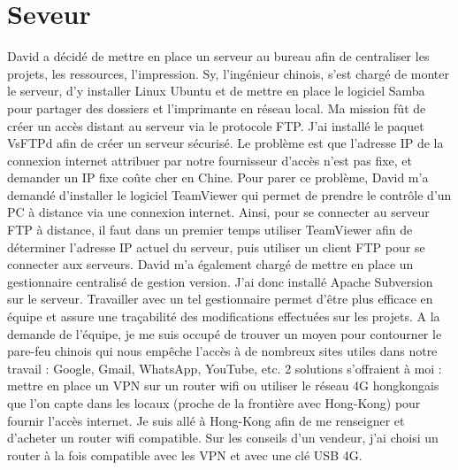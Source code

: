 \documentclass[a4paper, 11pt]{report}
\begin{document}
\section{Seveur}
David a décidé de mettre en place un serveur au bureau afin de centraliser les projets, les ressources, l’impression. Sy, l’ingénieur chinois, s’est chargé de monter le serveur, d’y installer Linux Ubuntu et de mettre en place le logiciel Samba pour partager des dossiers et l’imprimante en réseau local. Ma mission fût de créer un accès distant au serveur via le protocole FTP. J’ai installé le paquet VsFTPd afin de créer un serveur sécurisé. Le problème est que l’adresse IP de la connexion internet attribuer par notre fournisseur d’accès n’est pas fixe, et demander un IP fixe coûte cher en Chine. Pour parer ce problème, David m’a demandé d’installer le logiciel TeamViewer qui permet de prendre le contrôle d’un PC à distance via une connexion internet. Ainsi, pour se connecter au serveur FTP à distance, il faut dans un premier temps utiliser TeamViewer afin de déterminer l’adresse IP actuel du serveur, puis utiliser un client FTP pour se connecter aux serveurs.
David m’a également chargé de mettre en place un gestionnaire centralisé de gestion version. J’ai donc installé Apache Subversion sur le serveur. Travailler avec un tel gestionnaire permet d’être plus efficace en équipe et assure une traçabilité des modifications effectuées sur les projets.
A la demande de l’équipe, je me suis occupé de trouver un moyen pour contourner le pare-feu chinois qui nous empêche l’accès à de nombreux sites utiles dans notre travail : Google, Gmail, WhatsApp, YouTube, etc. 2 solutions s’offraient à moi : mettre en place un VPN sur un router wifi ou utiliser le réseau 4G hongkongais que l’on capte dans les locaux (proche de la frontière avec Hong-Kong) pour fournir l’accès internet. Je suis allé à Hong-Kong afin de me renseigner et d’acheter un router wifi compatible. Sur les conseils d’un vendeur, j’ai choisi un router à la fois compatible avec les VPN et avec une clé USB 4G.
\end{document}
